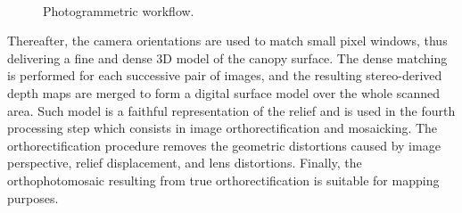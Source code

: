 \documentclass[remotesensing,article,submit,moreauthors,pdftex,12pt,a4paper]{mdpi} %
\begin{document}
\begin{figure}
\centering
\captionsetup[subfigure]{labelformat=empty}
\hspace{0.01mm}\\
\hspace{0.01mm}
\hspace{0.01mm}
\hspace{0.01mm}
\caption{Photogrammetric workflow.}
\label{fig:workflow}
\end{figure}

Thereafter, the camera orientations are used to match small pixel windows, thus delivering a fine and dense 3D model of the canopy surface. 
The dense matching is performed for each successive pair of images, and the resulting stereo-derived depth maps are merged to form a digital surface model over the whole scanned area. 
Such model is a faithful representation of the relief and is used in the fourth processing step which consists in image orthorectification and mosaicking. 
The orthorectification procedure removes the geometric distortions caused by image perspective, relief displacement, and lens distortions. 
Finally, the orthophotomosaic resulting from true orthorectification is suitable for mapping purposes.
\end{document}
